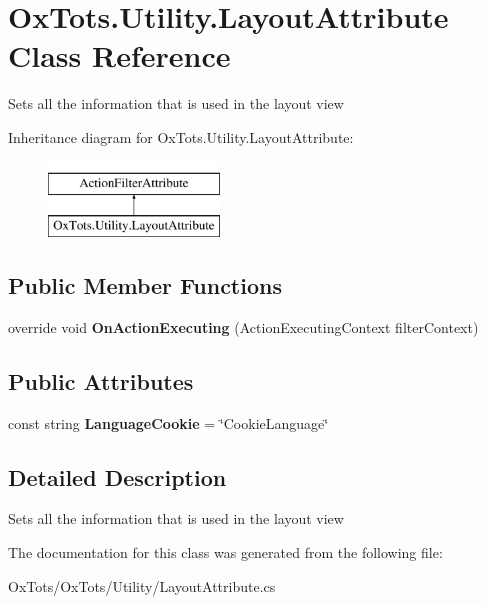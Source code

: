 \hypertarget{class_ox_tots_1_1_utility_1_1_layout_attribute}{}\section{Ox\+Tots.\+Utility.\+Layout\+Attribute Class Reference}
\label{class_ox_tots_1_1_utility_1_1_layout_attribute}


Sets all the information that is used in the layout view  


Inheritance diagram for Ox\+Tots.\+Utility.\+Layout\+Attribute\+:\begin{figure}[H]
\begin{center}
\leavevmode
\includegraphics[height=2.000000cm]{class_ox_tots_1_1_utility_1_1_layout_attribute}
\end{center}
\end{figure}
\subsection*{Public Member Functions}
\begin{DoxyCompactItemize}
\item 
\mbox{\label{class_ox_tots_1_1_utility_1_1_layout_attribute_a0ee4ea80f382be73df33010cbda8baac}} 
override void {\bfseries On\+Action\+Executing} (Action\+Executing\+Context filter\+Context)
\end{DoxyCompactItemize}
\subsection*{Public Attributes}
\begin{DoxyCompactItemize}
\item 
\mbox{\label{class_ox_tots_1_1_utility_1_1_layout_attribute_a775fc85cad4f6d79d858bb35278b6795}} 
const string {\bfseries Language\+Cookie} = \char`\"{}Cookie\+Language\char`\"{}
\end{DoxyCompactItemize}


\subsection{Detailed Description}
Sets all the information that is used in the layout view 



The documentation for this class was generated from the following file\+:\begin{DoxyCompactItemize}
\item 
Ox\+Tots/\+Ox\+Tots/\+Utility/Layout\+Attribute.\+cs\end{DoxyCompactItemize}
